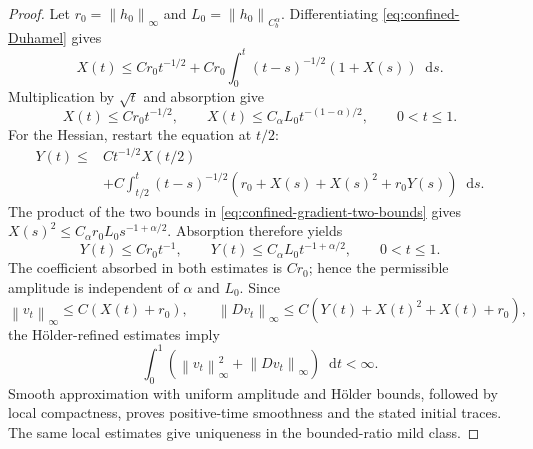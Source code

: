 \documentclass[11pt,reqno]{amsart}
\numberwithin{equation}{section}
\theoremstyle{definition}
\theoremstyle{remark}
\newcommand{\dd}{\mathop{}\!\mathrm d}
\newcommand{\norm}[1]{\left\lVert#1\right\rVert}
\begin{document}
\begin{proof}
Let $r_0=\norm{h_0}_\infty$ and $L_0=\norm{h_0}_{C_b^\alpha}$. Differentiating \eqref{eq:confined-Duhamel} gives
\begin{equation}\label{eq:confined-X-Volterra}
 X(t)\leq Cr_0t^{-1/2}+Cr_0\int_0^t(t-s)^{-1/2}(1+X(s))\dd s.
\end{equation}
Multiplication by $\sqrt t$ and absorption give
\begin{equation}\label{eq:confined-gradient-two-bounds}
 X(t)\leq Cr_0t^{-1/2},
 \qquad X(t)\leq C_\alpha L_0t^{-(1-\alpha)/2},
 \qquad0<t\leq1.
\end{equation}
For the Hessian, restart the equation at $t/2$:
\begin{equation}\label{eq:confined-Y-Volterra}
 \begin{split}
 Y(t)\leq{}&Ct^{-1/2}X(t/2)\\
 &+C\int_{t/2}^t(t-s)^{-1/2}
 \left(r_0+X(s)+X(s)^2+r_0Y(s)\right)\dd s.
 \end{split}
\end{equation}
The product of the two bounds in \eqref{eq:confined-gradient-two-bounds} gives
$X(s)^2\leq C_\alpha r_0L_0s^{-1+\alpha/2}$. Absorption therefore yields
\begin{equation}\label{eq:confined-hessian-two-bounds}
 Y(t)\leq Cr_0t^{-1},
 \qquad Y(t)\leq C_\alpha L_0t^{-1+\alpha/2},
 \qquad0<t\leq1.
\end{equation}
The coefficient absorbed in both estimates is $Cr_0$; hence the permissible amplitude is independent of $\alpha$ and $L_0$. Since
\begin{equation}\label{eq:confined-v-estimate}
 \norm{v_t}_\infty\leq C(X(t)+r_0),
 \qquad
 \norm{Dv_t}_\infty\leq C(Y(t)+X(t)^2+X(t)+r_0),
\end{equation}
the H\"older-refined estimates imply
\begin{equation}\label{eq:confined-initial-integrability}
 \int_0^1\left(\norm{v_t}_\infty^2+\norm{Dv_t}_\infty\right)\dd t<\infty.
\end{equation}
Smooth approximation with uniform amplitude and H\"older bounds, followed by local compactness, proves positive-time smoothness and the stated initial traces. The same local estimates give uniqueness in the bounded-ratio mild class.


\end{proof}
\end{document}
